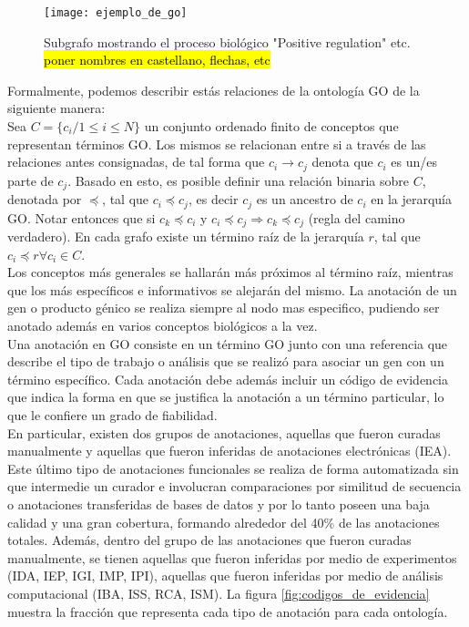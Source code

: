 \begin{figure}[h]
    \centering
    \texttt{[image: ejemplo\_de\_go]}
    \caption{Subgrafo mostrando el proceso biológico "Positive regulation" etc. \hl{poner nombres en castellano, flechas, etc}}
    \label{fig:ejemplo_de_go}
\end{figure}
Formalmente, podemos describir estás relaciones de la ontología GO de la siguiente manera:\\
Sea $C=\{c_i / 1\leq i \leq N\}$ un conjunto ordenado finito de conceptos que representan términos GO. Los mismos se relacionan entre si a través de las relaciones antes consignadas, de tal forma que $c_i \rightarrow c_j$ denota que $c_i$ es un/es parte de $c_j$. Basado en esto, es posible definir una relación binaria sobre $C$, denotada por $\preceq$, tal que $c_i \preceq c_j$, es decir $c_j$ es un ancestro de $c_i$ en la jerarquía GO. Notar entonces que si $c_k \preceq c_i$ y $c_i \preceq c_j \Rightarrow c_k \preceq c_j$ (regla del camino verdadero). En cada grafo existe un término raíz de la jerarquía $r$, tal que $c_i \preceq r \forall c_i \in C$.\\
Los conceptos más generales se hallarán más próximos al término raíz, mientras que los más específicos e informativos se alejarán del mismo. La anotación de un gen o producto génico se realiza siempre al nodo mas especifico, pudiendo ser anotado además en varios conceptos biológicos a la vez.\\
Una anotación en GO consiste en un término GO junto con una referencia que describe el tipo de trabajo o análisis que se realizó para asociar un gen con un término específico. Cada anotación debe además incluir un código de evidencia que indica la forma en que se justifica la anotación a un término particular, lo que le confiere un grado de fiabilidad.\\En particular, existen dos grupos de anotaciones, aquellas que fueron curadas manualmente y aquellas que fueron inferidas de anotaciones electrónicas (IEA). Este último tipo de anotaciones funcionales se realiza de forma automatizada sin que intermedie un curador e involucran comparaciones por similitud de secuencia o anotaciones transferidas de bases de datos y por lo tanto poseen una baja calidad y una gran cobertura, formando alrededor del 40\% de las anotaciones totales. Además, dentro del grupo de las anotaciones que fueron curadas manualmente, se tienen aquellas que fueron inferidas por medio de experimentos (IDA, IEP, IGI, IMP, IPI), aquellas que fueron inferidas por medio de análisis computacional (IBA, ISS, RCA, ISM). La figura \ref{fig:codigos_de_evidencia} muestra la fracción que representa cada tipo de anotación para cada ontología.
